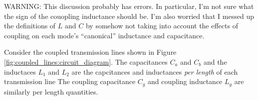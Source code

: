 WARNING: This discussion probably has errors. In particular, I'm not sure what the sign of the couopling inductance should be. I'm also worried that I messed up the definitions of $L$ and $C$ by somehow not taking into account the effects of coupling on each mode's ``canonical'' inductance and capacitance.

Consider the coupled transmission lines shown in Figure \ref{fig:coupled_lines:circuit_diagram}.
The capacitances $C_a$ and $C_b$ and the inductaces $L_1$ and $L_2$ are the capcitances and inductances \emph{per length} of each transmission line
The coupling capacitance $C_g$ and coupling inductance $L_g$ are similarly per length quantities.


